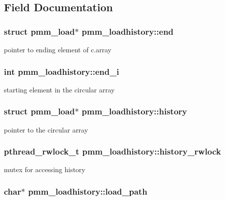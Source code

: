 \subsection{Field Documentation}
\hypertarget{structpmm__loadhistory_a5e799b7ad1c650bd965a2f672b730e78}{
\subsubsection[{end}]{\setlength{\rightskip}{0pt plus 5cm}struct {\bf pmm\-\_\-load}$\ast$ pmm\-\_\-loadhistory\-::end}}\label{structpmm__loadhistory_a5e799b7ad1c650bd965a2f672b730e78}
pointer to ending element of c.\-array \hypertarget{structpmm__loadhistory_a5625aa601ce71467ddc8f4720db32a73}{
\subsubsection[{end\-\_\-i}]{\setlength{\rightskip}{0pt plus 5cm}int pmm\-\_\-loadhistory\-::end\-\_\-i}}\label{structpmm__loadhistory_a5625aa601ce71467ddc8f4720db32a73}
starting element in the circular array \hypertarget{structpmm__loadhistory_ac1a03c7b76da5e55fa51faab0b4a1adf}{
\subsubsection[{history}]{\setlength{\rightskip}{0pt plus 5cm}struct {\bf pmm\-\_\-load}$\ast$ pmm\-\_\-loadhistory\-::history}}\label{structpmm__loadhistory_ac1a03c7b76da5e55fa51faab0b4a1adf}
pointer to the circular array \hypertarget{structpmm__loadhistory_ae0fbcd6252ab6a1ab49be6f891271ccb}{
\subsubsection[{history\-\_\-rwlock}]{\setlength{\rightskip}{0pt plus 5cm}pthread\-\_\-rwlock\-\_\-t pmm\-\_\-loadhistory\-::history\-\_\-rwlock}}\label{structpmm__loadhistory_ae0fbcd6252ab6a1ab49be6f891271ccb}
mutex for accessing history \hypertarget{structpmm__loadhistory_a8e8ae65131890372da0bbeff437fad31}{
\subsubsection[{load\-\_\-path}]{\setlength{\rightskip}{0pt plus 5cm}char$\ast$ pmm\-\_\-loadhistory\-::load\-\_\-path}}\label{structpmm__loadhistory_a8e8ae65131890372da0bbeff437fad31}
